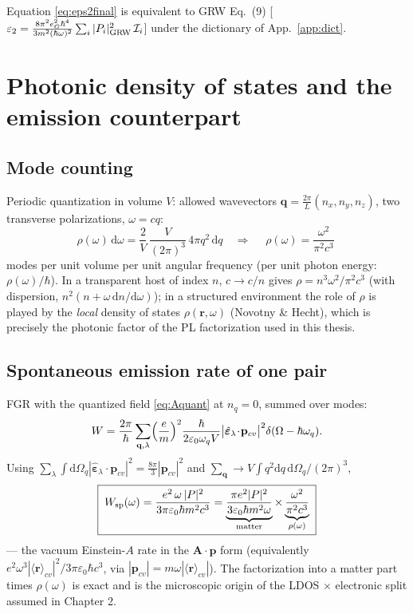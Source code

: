 \documentclass[11pt,a4paper]{article}
\numberwithin{equation}{section}
\newcommand{\hw}{\hbar\omega}
\newcommand{\pcv}{\mathbf{p}_{cv}}
\newcommand{\eps}{\varepsilon}
\newcommand{\epsz}{\varepsilon_0}
\newcommand{\dd}{\mathrm{d}}
\begin{document}
Equation \eqref{eq:eps2final} is equivalent to GRW Eq.~(9)
[$\eps_2=\tfrac{8\pi^2e_G^2\hbar^4}{3m^2(\hw)^2}\sum_i|P_i|^2_{\rm GRW}
\,\mathcal{I}_i$] under the dictionary of App.~\ref{app:dict}.

\section{Photonic density of states and the emission counterpart}
\label{sec:photonic}

\subsection{Mode counting}

Periodic quantization in volume $V$: allowed wavevectors
$\mathbf q=\tfrac{2\pi}{L}(n_x,n_y,n_z)$, two transverse polarizations,
$\omega=cq$:
\begin{equation}
\rho(\omega)\,\dd\omega
=\frac{2}{V}\,\frac{V}{(2\pi)^3}\,4\pi q^2\,\dd q
\quad\Longrightarrow\quad
\boxed{\;\rho(\omega)=\frac{\omega^2}{\pi^2c^3}\;}
\label{eq:rhophot}
\end{equation}
modes per unit volume per unit angular frequency (per unit photon
energy: $\rho(\omega)/\hbar$).  In a transparent host of index $n$,
$c\to c/n$ gives $\rho=n^3\omega^2/\pi^2c^3$ (with dispersion,
$n^2(n+\omega\,\dd n/\dd\omega)$); in a structured environment the
role of $\rho$ is played by the \emph{local} density of states
$\rho(\mathbf r,\omega)$ (Novotny \& Hecht), which is precisely the
photonic factor of the PL factorization used in this thesis.

\subsection{Spontaneous emission rate of one pair}

FGR with the quantized field \eqref{eq:Aquant} at $n_q=0$, summed over
modes:
\begin{equation}
W=\frac{2\pi}{\hbar}\sum_{\mathbf q,\lambda}
\Bigl(\frac{e}{m}\Bigr)^2\frac{\hbar}{2\epsz\omega_qV}
\bigl|\hat{\bm\eps}_\lambda\!\cdot\!\pcv\bigr|^2
\delta(\Omega-\hbar\omega_q).
\end{equation}
Using $\sum_\lambda\int\dd\Omega_q
|\hat{\bm\eps}_\lambda\!\cdot\!\pcv|^2=\tfrac{8\pi}{3}|\pcv|^2$ and
$\sum_{\mathbf q}\to V\!\int\!q^2\dd q\,\dd\Omega_q/(2\pi)^3$,
\begin{equation}
\boxed{\;
W_{\rm sp}(\omega)
=\frac{e^2\,\omega\,|P|^2}{3\pi\epsz\hbar m^2c^3}
=\underbrace{\frac{\pi e^2|P|^2}{3\epsz\hbar m^2\omega}}_{\text{matter}}
\times\underbrace{\frac{\omega^2}{\pi^2c^3}}_{\rho(\omega)}
\;}
\label{eq:Wsp}
\end{equation}
--- the vacuum Einstein-$A$ rate in the $\mathbf A\!\cdot\!\mathbf p$
form (equivalently $e^2\omega^3|\langle\mathbf r\rangle_{cv}|^2/
3\pi\epsz\hbar c^3$, via $|\pcv|=m\omega|\langle\mathbf r\rangle_{cv}|$).  The
factorization into a matter part times $\rho(\omega)$ is exact and is
the microscopic origin of the LDOS $\times$ electronic split assumed
in Chapter 2.
\end{document}

